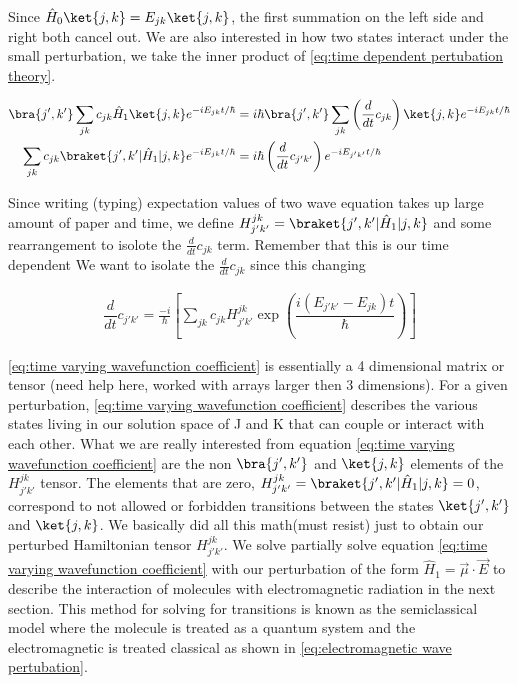 \documentclass[11pt,a4paper]{book}
\begin{document}
			\noindent
			Since $\hat{H}_0\ket{j, k} = E_{jk}\ket{j,k}$, the first summation on the left side and right both cancel out. We are also interested in how two states interact under the small perturbation, we take the inner product of \autoref{eq:time dependent pertubation theory}.
			
			\begin{equation}
				\begin{split}
					\bra{j',k'}\sum_{jk} c_{jk} \hat{H}_1 \ket{j, k} e^{-i E_{j k} t/ \hbar}
					& =
					i\hbar \bra{j',k'}\sum_{jk} \left(\dfrac{d}{dt}{c}_{jk} \right) \ket{ j, k}e^{-i E_{jk} t/ \hbar} 
					\\
					\sum_{jk} c_{jk} \braket{j',k'|\hat{H}_1|j,k} e^{-i E_{j k} t/ \hbar} & = i\hbar \left(\dfrac{d}{dt}{c}_{j'k'} \right) e^{-i E_{j'k'} t/ \hbar}
				\end{split}
			\end{equation}
			
			Since writing (typing) expectation values of two wave equation takes up large amount of paper and time, we define $H_{j'k'}^{jk} = \braket{j',k'| \hat{H}_1 |j, k}$ and some rearrangement to isolote the $\frac{d}{dt}{c}_{jk}$ term. Remember that this is our time dependent We want to isolate the $\frac{d}{dt}{c}_{jk}$ since this changing 
			
			\begin{equation}
				\label{eq:time varying wavefunction coefficient} 
				\begin{split}
					\dfrac{d}{dt}{c}_{j'k'}
					=\frac{-i}{\hbar}
					\left[
					\sum_{jk} c_{jk} H_{j'k'}^{jk} \exp{
						\left
						(\dfrac{i(E_{j' k'} - E_{j k}) t} {\hbar}
						\right)} 
					\right]
				\end{split}
			\end{equation}
			
			\autoref{eq:time varying wavefunction coefficient} is essentially a 4 dimensional matrix or tensor (need help here, worked with arrays larger then 3 dimensions). For a given perturbation, \autoref{eq:time varying wavefunction coefficient} describes the various states living in our solution space of J and K that can couple or interact with each other. What we are really interested from equation \autoref{eq:time varying wavefunction coefficient} are the non $\bra{j',k'}$ and $\ket{j,k}$ elements of the $H_{j'k'}^{jk}$ tensor. The elements that are zero, $H_{j'k'}^{jk} = \braket{j',k'| \hat{H}_1 |j, k} = 0$, correspond to not allowed or forbidden transitions between the states $\ket{j',k'}$ and $\ket{j,k}$. We basically did all this math(must resist) just to obtain our perturbed Hamiltonian tensor $H_{j'k'}^{jk}$. We solve partially solve equation \autoref{eq:time varying wavefunction coefficient} with our perturbation of the form $\hat{H}_1 = \vec{\mu}\cdot \vec{E}$ to describe the interaction of molecules with electromagnetic radiation in the next section. This method for solving for transitions is known as the semiclassical model where the molecule is treated as a quantum system and the electromagnetic is treated classical as shown in \autoref{eq:electromagnetic wave pertubation}.
			
\end{document}
